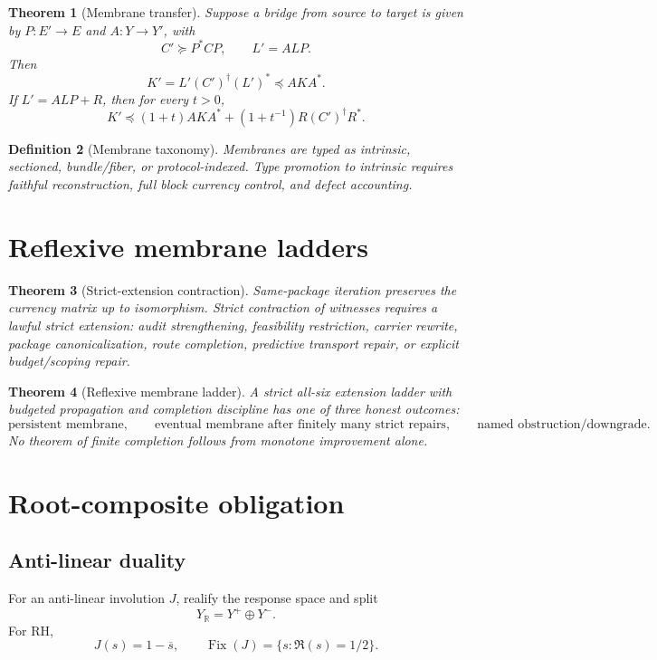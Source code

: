 \documentclass[11pt]{article}
\newtheorem{theorem}{Theorem}[section]
\newtheorem{definition}[theorem]{Definition}
\DeclareMathOperator{\Fix}{Fix}
\newcommand{\Loewner}{\preceq}
\begin{document}
\begin{theorem}[Membrane transfer]
Suppose a bridge from source to target is given by \(P:E'\to E\) and \(A:Y\to Y'\), with
\[
  C'\succeq P^*CP,
  \qquad
  L'=ALP.
\]
Then
\[
  K'=L'(C')^\dagger(L')^*\Loewner AK A^*.
\]
If \(L'=ALP+R\), then for every \(t>0\),
\[
  K'\Loewner(1+t)AKA^*+(1+t^{-1})R(C')^\dagger R^*.
\]
\end{theorem}

\begin{definition}[Membrane taxonomy]
Membranes are typed as intrinsic, sectioned, bundle/fiber, or protocol-indexed.  Type promotion to intrinsic requires faithful reconstruction, full block currency control, and defect accounting.
\end{definition}

\section{Reflexive membrane ladders}

\begin{theorem}[Strict-extension contraction]
Same-package iteration preserves the currency matrix up to isomorphism.  Strict contraction of witnesses requires a lawful strict extension: audit strengthening, feasibility restriction, carrier rewrite, package canonicalization, route completion, predictive transport repair, or explicit budget/scoping repair.
\end{theorem}

\begin{theorem}[Reflexive membrane ladder]
A strict all-six extension ladder with budgeted propagation and completion discipline has one of three honest outcomes:
\[
\text{persistent membrane},\qquad
\text{eventual membrane after finitely many strict repairs},\qquad
\text{named obstruction/downgrade}.
\]
No theorem of finite completion follows from monotone improvement alone.
\end{theorem}

\section{Root-composite obligation}

\subsection{Anti-linear duality}
For an anti-linear involution \(J\), realify the response space and split
\[
  Y_{\mathbb R}=Y^+\oplus Y^-.
\]
For RH,
\[
  J(s)=1-\overline s,
  \qquad
  \Fix(J)=\{s:\Re(s)=1/2\}.
\]
\end{document}
